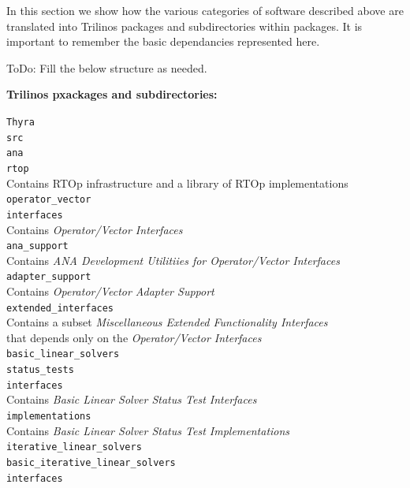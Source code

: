 \documentclass[pdf,ps2pdf,11pt]{SANDreport}
\begin{document}
In this section we show how the various categories of software described above
are translated into Trilinos packages and subdirectories within packages.  It
is important to remember the basic dependancies represented here.

ToDo: Fill the below structure as needed.

\noindent{}\textbf{Trilinos pxackages and subdirectories:}
%

\bifthen
\>{}\texttt{Thyra} \\
\>\>\texttt{src} \\
\>\>\>\texttt{ana} \\
\>\>\>\>\texttt{rtop}\\
\>\>\>\>\>Contains RTOp infrastructure and a library of RTOp implementations \\
\>\>\>\>\texttt{operator\_vector} \\
\>\>\>\>\>\texttt{interfaces} \\
\>\>\>\>\>\>Contains {}\textit{Operator/Vector Interfaces} \\
\>\>\>\>\>\texttt{ana\_support}\\
\>\>\>\>\>\>Contains {}\textit{ANA Development Utilitiies for Operator/Vector Interfaces} \\
\>\>\>\>\>\texttt{adapter\_support}\\
\>\>\>\>\>\>Contains {}\textit{Operator/Vector Adapter Support} \\
\>\>\>\>\>\texttt{extended\_interfaces} \\
\>\>\>\>\>\>Contains a subset {}\textit{Miscellaneous Extended Functionality Interfaces} \\
\>\>\>\>\>\>\>that depends only on the {}\textit{Operator/Vector Interfaces} \\
\>\>\>\>\texttt{basic\_linear\_solvers} \\
\>\>\>\>\>\texttt{status\_tests} \\
\>\>\>\>\>\>\texttt{interfaces} \\
\>\>\>\>\>\>\>Contains {}\textit{Basic Linear Solver Status Test Interfaces} \\
\>\>\>\>\>\>\texttt{implementations} \\
\>\>\>\>\>\>\>Contains {}\textit{Basic Linear Solver Status Test Implementations} \\
\>\>\>\>\>\texttt{iterative\_linear\_solvers} \\
\>\>\>\>\>\>\texttt{basic\_iterative\_linear\_solvers} \\
\>\>\>\>\>\>\>\texttt{interfaces} \\
\end{document}
